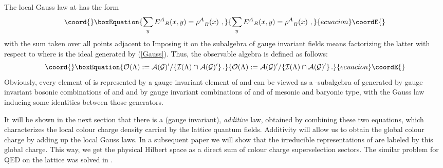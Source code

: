 \documentclass[a4paper,12pt]{article}
\begin{document}
The local Gauss law at \coordHE{} has the form
\begin{equation}\coord{}\boxEquation{
\label{Gauss} \sum_y {E^A}_B(x,y) = {\rho^A}_B(x) \ ,
}{
\sum_y {E^A}_B(x,y) = {\rho^A}_B(x) \ ,
}{ecuacion}\coordE{}\end{equation}
with the sum taken over all points \coordHE{} adjacent to \coordHE{}
Imposing it on the subalgebra \coordHE{} of gauge
invariant fields means factorizing the latter with respect to
\coordHE{} where \coordHE{} is the ideal  generated by (\ref{Gauss}). Thus, the
observable algebra is defined as follows:
\begin{equation}\coord{}\boxEquation{
\label{observ} {\cal O}(\Lambda ) := {\cal A}({\cal G})' / \{{\cal
I}(\Lambda ) \cap {\cal A}({\cal G})'\} \, .
}{
{\cal O}(\Lambda ) := {\cal A}({\cal G})' / \{{\cal
I}(\Lambda ) \cap {\cal A}({\cal G})'\} \, .
}{ecuacion}\coordE{}\end{equation}
Obviously, every element of \coordHE{} is represented by
a gauge invariant element of \coordHE{} and \coordHE{} can be viewed as a \myHighlight{$*$}\coordHE{}-subalgebra of \coordHE{} generated by gauge invariant bosonic combinations of
\coordHE{} and \coordHE{} and by gauge invariant combinations of \myHighlight{$\psi$}\coordHE{} and
\myHighlight{$\psi^*$}\coordHE{} of mesonic and baryonic type, with the Gauss law inducing
some identities between those generators.


It will be shown in the next section that there is a (gauge
invariant), {\em additive} law, obtained by combining these two
equations, which characterizes the local colour charge density
carried by the lattice quantum fields. Additivity will allow us to
obtain the global colour charge by adding up the local Gauss laws.
In a subsequent paper we will show that the irreducible
representations of \coordHE{} are labeled by this global
charge. This way, we get the physical Hilbert space \coordHE{} as a direct sum of colour charge superselection
sectors. The similar problem for QED on the lattice was solved in
\cite{KRT}.
\end{document}
